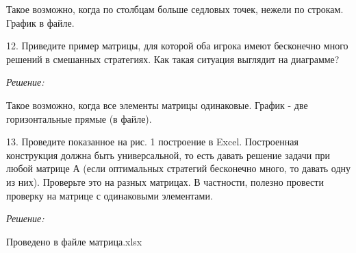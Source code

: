 \documentclass[aps,%
12pt,%
final,%
oneside,
onecolumn,%
musixtex, %
superscriptaddress,%
centertags]{article} %
\begin{document}
Такое возможно, когда по столбцам больше седловых точек, нежели по строкам. График в файле.

12. Приведите пример матрицы, для которой оба игрока имеют бесконечно много решений в смешанных стратегиях. Как такая ситуация выглядит на диаграмме?

\textit{Решение:}

Такое возможно, когда все элементы матрицы одинаковые. График - две горизонтальные прямые (в файле).

13. Проведите показанное на рис. 1 построение в Excel. Построенная конструкция должна быть универсальной, то есть давать решение задачи при любой матрице А (если оптимальных стратегий бесконечно много, то давать одну из них). Проверьте это на разных матрицах. В частности, полезно провести проверку на матрице с одинаковыми элементами.

\textit{Решение:}

Проведено в файле матрица.xlsx
\end{document}
